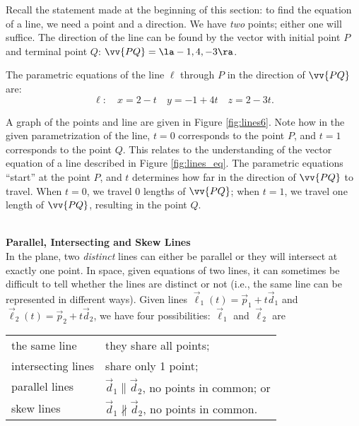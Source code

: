 {Recall the statement made at the beginning of this section: to find the equation of a line, we need a point and a direction. We have \emph{two} points; either one will suffice. The direction of the line can be found by the vector with initial point $P$ and terminal point $Q$: $\vv{PQ} = \la -1,4,-3\ra$.

The parametric equations of the line $\ell$ through $P$ in the direction of $\vv{PQ}$ are:
\[
\ell: \quad x= 2-t\quad y=-1+4t \quad z=2-3t.
\]

A graph of the points and line are given in Figure \ref{fig:lines6}. Note how in the given parametrization of the line, $t=0$ corresponds to the point $P$, and $t=1$ corresponds to the point $Q$. This relates to the understanding of the vector equation of a line described in Figure \ref{fig:lines_eq}. The parametric equations ``start'' at the point $P$, and $t$ determines how far in the direction of $\vv{PQ}$ to travel. When $t=0$, we travel 0 lengths of $\vv{PQ}$; when $t=1$, we travel one length of $\vv{PQ}$, resulting in the point $Q$.
}\\

\noindent \textbf{\large Parallel, Intersecting and Skew Lines}\\

In the plane, two \emph{distinct} lines can either be parallel or they will intersect at exactly one point. In space, given equations of two lines, it can sometimes be difficult to tell whether the lines are distinct or not (i.e., the same line can be represented in different ways). Given lines $\vec\ell_1(t) = \vec p_1 + t\vec d_1$ and $\vec \ell_2(t) = \vec p_2+t\vec d_2$, we have four possibilities: $\vec \ell_1$ and $\vec \ell_2$ are

\begin{center}
\begin{tabular}{p{100pt}p{150pt}}
the same line & they share all points; \\
intersecting lines & share only 1 point;\\
parallel lines & $\vec d_1\parallel \vec d_2$, no points in common; or \\
skew lines & $\vec d_1\nparallel \vec d_2$, no points in common. 
\end{tabular}
\end{center}

